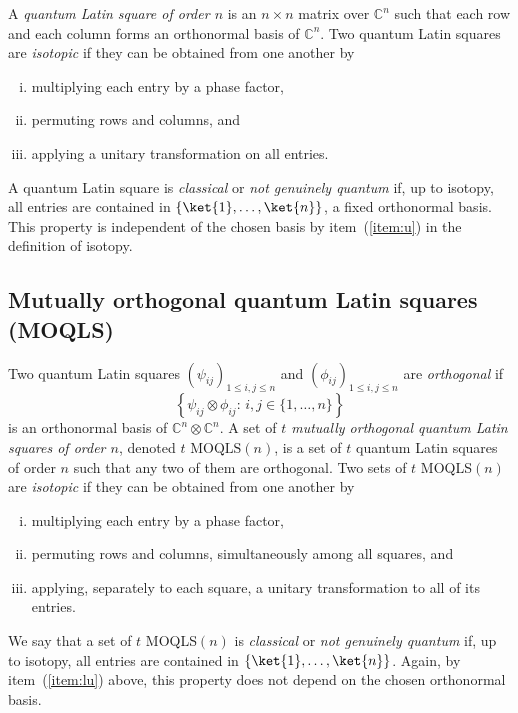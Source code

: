 \documentclass[a4paper]{article}
\theoremstyle{definition}
\newcommand{\CC}{\mathbb C}
\newcommand{\MOQLS}[1]{\(\mathrm{MOQLS}(#1)\)}
\begin{document}
A \emph{quantum Latin square of order \(n\)} is an \(n\times n\) matrix over \(\CC^n\) such that each row and each column forms an orthonormal basis of \(\CC^n\).
Two quantum Latin squares are \emph{isotopic} if they can be obtained from one another by
\begin{enumerate}[(i)]
    \item multiplying each entry by a phase factor,
    \item permuting rows and columns, and
    \item\label{item:u} applying a unitary transformation on all entries.
\end{enumerate}
A quantum Latin square is \emph{classical} or \emph{not genuinely quantum} if, up to isotopy, all entries are contained in \(\left\{\ket{1},\dots,\ket{n}\right\}\), a fixed orthonormal basis.
This property is independent of the chosen basis by item~(\ref{item:u}) in the definition of isotopy.

\subsection{Mutually orthogonal quantum Latin squares (MOQLS)}

Two quantum Latin squares \(\left(\psi_{ij}\right)_{1\leq i,j\leq n}\) and \(\left(\phi_{ij}\right)_{1\leq i,j\leq n}\) are \emph{orthogonal} if \[\left\{\psi_{ij}\otimes\phi_{ij}\colon\,i,j\in\{1,\dots,n\}\right\}\] is an orthonormal basis of \(\CC^n\otimes\CC^n\).
A set of \emph{\(t\) mutually orthogonal quantum Latin squares of order \(n\)}, denoted \(t\) \MOQLS{n}, is a set of \(t\) quantum Latin squares of order \(n\) such that any two of them are orthogonal.
Two sets of \(t\) MOQLS\((n)\) are \emph{isotopic} if they can be obtained from one another by
\begin{enumerate}[(i)]
    \item multiplying each entry by a phase factor,
    \item permuting rows and columns, simultaneously among all squares, and
    \item\label{item:lu} applying, separately to each square, a unitary transformation to all of its entries.
\end{enumerate}
We say that a set of \(t\) MOQLS\((n)\) is \emph{classical} or \emph{not genuinely quantum} if, up to isotopy, all entries are contained in \(\left\{\ket{1},\dots,\ket{n}\right\}\). Again, by item~(\ref{item:lu}) above, this property does not depend on the chosen orthonormal basis.
\end{document}
